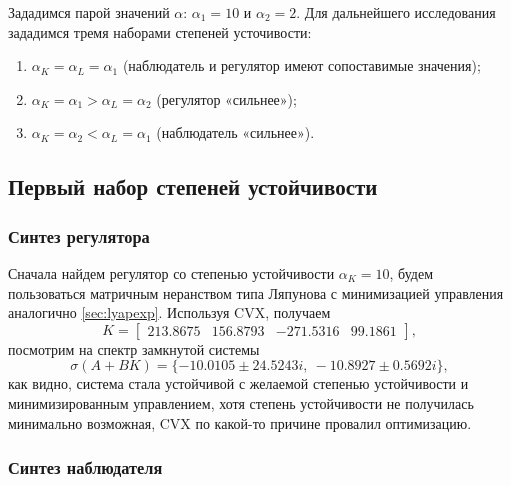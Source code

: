 Зададимся парой значений $\alpha$: $\alpha_1=10$ и $\alpha_2=2$. Для
дальнейшего исследования зададимся тремя наборами степеней усточивости:
\begin{enumerate}
    \item $\alpha_K=\alpha_L=\alpha_1$ (наблюдатель и регулятор имеют сопоставимые значения);
    \item $\alpha_K=\alpha_1>\alpha_L=\alpha_2$ (регулятор «сильнее»);
    \item $\alpha_K=\alpha_2<\alpha_L=\alpha_1$ (наблюдатель «сильнее»).
\end{enumerate}


\subsection{Первый набор степеней устойчивости}

\subsubsection{Синтез регулятора}

Сначала найдем регулятор со степенью устойчивости $\alpha_K=10$, будем пользоваться
матричным неранством типа Ляпунова с минимизацией управления аналогично \autoref{sec:lyapexp}. 
Используя CVX, получаем
\begin{equation}
    K=\begin{bmatrix}
        213.8675&	156.8793&	-271.5316&	99.1861
    \end{bmatrix},
    \label{eq:K10}
\end{equation}
посмотрим на спектр замкнутой системы
\begin{equation*}
    \sigma(A+BK)=\{-10.0105 \pm 24.5243i,\ -10.8927 \pm 0.5692i \},
\end{equation*}
как видно, система стала устойчивой с желаемой степенью устойчивости и 
минимизированным управлением, хотя степень устойчивости не получилась минимально
возможная, CVX по какой-то причине провалил оптимизацию.


\subsubsection{Синтез наблюдателя}

